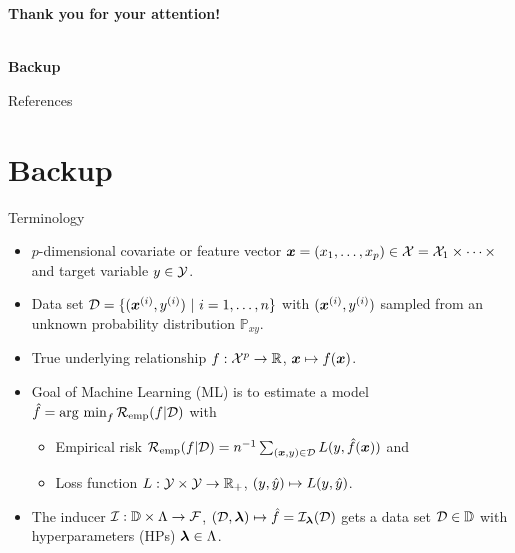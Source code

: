 \documentclass[t,10pt]{beamer}
\newcommand{\fSlide}[2]{
\begin{frame}[plain]{}%
  \vspace{4cm}%
  \Large #1\\[0.2cm]%
  {\LARGE\textbf{#2}}%
	\addtocounter{framenumber}{-1}%
\end{frame}%
}
\newcommand{\backupbegin}{
   \newcounter{finalframe}
   \setcounter{finalframe}{\value{framenumber}}
}
\begin{document}
\begin{frame}[plain]{}
    \centering\vspace{4cm}
    {\LARGE\bfseries \color{white}Thank you for your attention!}
    \addtocounter{framenumber}{-1}
\end{frame}


\backupbegin
\fSlide{\phantom{Backup}}{Backup}

\begin{frame}[allowframebreaks]{References}
\nocite{*}
\scriptsize


\end{frame}

\section*{Backup}

\begin{frame}{Terminology}
  \begin{itemize}

    \item
      $p$-dimensional covariate or feature vector $\bm{x} = (x_1, \dots, x_p) \in \mathcal{X} =  \mathcal{X}_1 \times \cdots\times$ and target variable $y\in\mathcal{Y}$.

    \item
      Data set $\mathcal{D} = \{(\bm{x}^{(i)}, y^{(i)})\ |\ i = 1, \dots, n\}$ with $(\bm{x}^{(i)}, y^{(i)})$ sampled from an unknown probability distribution $\mathbb{P}_{xy}$.

    \item
      True underlying relationship $f : \mathcal{X}^p \to \mathbb{R}$, $\bm{x} \mapsto f(\bm{x})$.

    \item
      Goal of Machine Learning (ML) is to estimate a model $\hat{f} = \operatorname{arg~min}_{f} \mathcal{R}_{\text{emp}}(f | \mathcal{D})$ with
      \begin{itemize}
        \item Empirical risk $\mathcal{R}_{\text{emp}}(f | \mathcal{D}) = n^{-1} \sum_{(\bm{x}, y)\in\mathcal{D}} L(y, \hat{f}(\bm{x}))$ and
        \item Loss function $L : \mathcal{Y}\times\mathcal{Y} \to \mathbb{R}_+$, $(y,\hat{y}) \mapsto L(y,\hat{y})$.
      \end{itemize}

    \item
      The inducer $\mathcal{I} : \mathbb{D} \times \Lambda \to \mathcal{F}$, $(\mathcal{D}, \bm{\lambda}) \mapsto \hat{f}=\mathcal{I}_{\bm{\lambda}}(\mathcal{D})$ gets a data set $\mathcal{D}\in\mathbb{D}$ with hyperparameters (HPs) $\bm{\lambda}\in\Lambda$.

  \end{itemize}
\end{frame}
\end{document}
